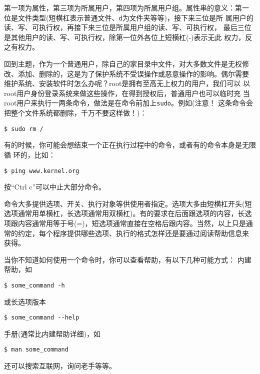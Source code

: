 \documentclass[a4paper]{article}
\begin{document}
第一项为属性，第三项为所属用户，第四项为所属用户组。属性串的意义：第一
位是文件类型(短横杠表示普通文件、\verb|d|为文件夹等等)，接下来三位是所
属用户的读、写、可执行权，再接下来三位是所属用户组的读、写、可执行权，
最后三位是其他用户的读、写、可执行权，除第一位外各位上短横杠(-)表示无此
权力，反之有权力。

回到主题，作为一个普通用户，除自己的家目录中文件，对大多数文件是无权修
改、添加、删除的，这是为了保护系统不受误操作或恶意操作的影响。偶尔需要
维护系统、安装软件时怎么办呢？root是拥有至高无上权力的用户，我们可以
以root用户身份登录系统来做这些操作，在得到授权后，普通用户也可以临时充
当root用户来执行一两条命令，做法是在命令前加上\verb|sudo|。例如(注意！
这条命令会把整个文件系统都删除，千万不要这样做！)：
\begin{verbatim}
$ sudo rm /
\end{verbatim}

有的时候，你可能会想结束一个正在执行过程中的命令，或者有的命令本身是无限循
环的，比如：
\begin{verbatim}
$ ping www.kernel.org
\end{verbatim}
按``Ctrl c''可以中止大部分命令。

命令大多提供选项、开关、执行对象等供使用者指定。选项大多由短横杠开头(短
选项通常用单横杠，长选项通常用双横杠)。有的要求在后面跟选项的内容，长选
项跟内容通常用等于号(=)，短选项通常直接在空格后跟内容。当然，以上只是通
常的约定，每个程序提供哪些选项、执行的格式怎样还是要通过阅读帮助信息来
获得。

当你不知道如何使用一个命令时，你可以查看帮助，有以下几种可能方式：
内建帮助，如
\begin{verbatim}
$ some_command -h
\end{verbatim}
或长选项版本
\begin{verbatim}
$ some_command --help
\end{verbatim}
手册(通常比内建帮助详细)，如
\begin{verbatim}
$ man some_command
\end{verbatim}
还可以搜索互联网，询问老手等等。
\end{document}
